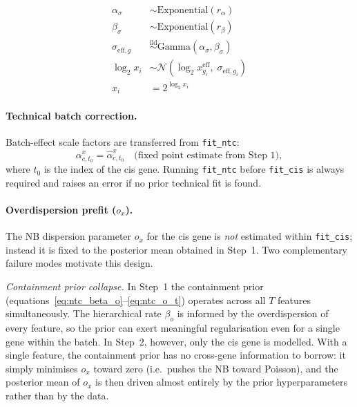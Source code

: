 \documentclass[12pt]{article}
\newcommand{\iid}{\overset{\mathrm{iid}}{\sim}}
\begin{document}
\begin{align}
  \alpha_\sigma &\sim \mathrm{Exponential}(r_\alpha)
      \label{eq:cis_alpha_sigma} \\
  \beta_\sigma  &\sim \mathrm{Exponential}(r_\beta)
      \label{eq:cis_beta_sigma} \\
  \sigma_{\mathrm{eff},g} &\iid \mathrm{Gamma}(\alpha_\sigma, \beta_\sigma)
      \label{eq:cis_sigma_eff} \\
  \log_2 x_i &\sim \mathcal{N}\!\left(\log_2 x_{g_i}^{\mathrm{eff}},\;
      \sigma_{\mathrm{eff}, g_i}\right)
      \label{eq:cis_log2_xtrue} \\
  x_i &= 2^{\log_2 x_i}
      \label{eq:cis_xtrue}
\end{align}

\paragraph{Technical batch correction.}

Batch-effect scale factors are transferred from \texttt{fit\_ntc}:
\begin{equation}
  \alpha_{c,t_0}^x = \hat\alpha_{c,t_0}^x
      \quad \text{(fixed point estimate from Step 1)},
\end{equation}
where $t_0$ is the index of the cis gene.
Running \texttt{fit\_ntc} before \texttt{fit\_cis} is always required and raises an error if
no prior technical fit is found.

\paragraph{Overdispersion prefit ($o_x$).}

The NB dispersion parameter $o_x$ for the cis gene is \emph{not} estimated within
\texttt{fit\_cis}; instead it is fixed to the posterior mean obtained in Step~1.
Two complementary failure modes motivate this design.

\textit{Containment prior collapse.}
In Step~1 the containment prior (equations~\ref{eq:ntc_beta_o}--\ref{eq:ntc_o_t}) operates
across all $T$ features simultaneously.
The hierarchical rate $\beta_o$ is informed by the overdispersion of every feature, so the
prior can exert meaningful regularisation even for a single gene within the batch.
In Step~2, however, only the cis gene is modelled.
With a single feature, the containment prior has no cross-gene information to borrow:
it simply minimises $o_x$ toward zero (i.e.\ pushes the NB toward Poisson),
and the posterior mean of $o_x$ is then driven almost entirely by the prior hyperparameters
rather than by the data.
\end{document}
